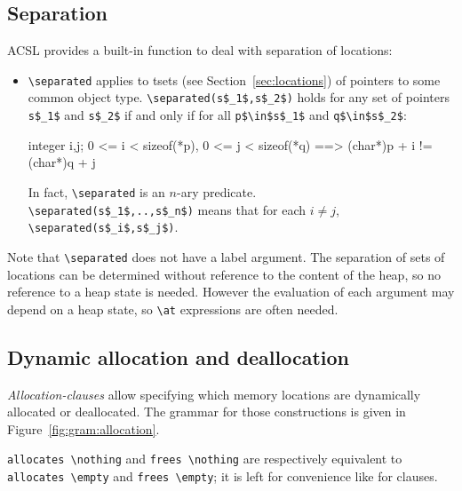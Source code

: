 \subsection{Separation}\label{sec:separated}

ACSL provides a built-in function to deal with separation of locations:

\begin{itemize}
\item \lstinline|\separated|
applies to tsets (see Section~\ref{sec:locations}) of pointers 
to some common object type.
\lstinline|\separated(s$_1$,s$_2$)|
holds for any set of pointers \lstinline|s$_1$| and \lstinline|s$_2$|
if and only if for all \lstinline|p$\in$s$_1$| and \lstinline|q$\in$s$_2$|:
\begin{listing-nonumber}
\forall integer i,j; 0 <= i < sizeof(*p), 0 <= j < sizeof(*q) ==>
  (char*)p + i != (char*)q + j
\end{listing-nonumber}

In fact, \lstinline|\separated| is an $n$-ary predicate.\\
\lstinline|\separated(s$_1$,..,s$_n$)| means
that for each
$i\neq j$, \lstinline|\separated(s$_i$,s$_j$)|.
\end{itemize}

Note that \lstinline|\separated| does not have a label argument. The separation of sets of locations
can be determined without reference to the content of the heap, so no reference to a heap state is needed.
However the evaluation of each argument may depend on a heap state, so \lstinline|\at| expressions are often needed.


\subsection{Dynamic allocation and deallocation}
\label{sec:allocation-clause}

\experimental

\textsl{Allocation-clauses} allow specifying which memory locations
are dynamically allocated or deallocated.
The grammar for those constructions is given in Figure~\ref{fig:gram:allocation}.

\lstinline|allocates \nothing| and \lstinline|frees \nothing| are respectively
equivalent to \lstinline|allocates \empty| and \lstinline|frees \empty|;
it is left for convenience like for \assigns clauses.

